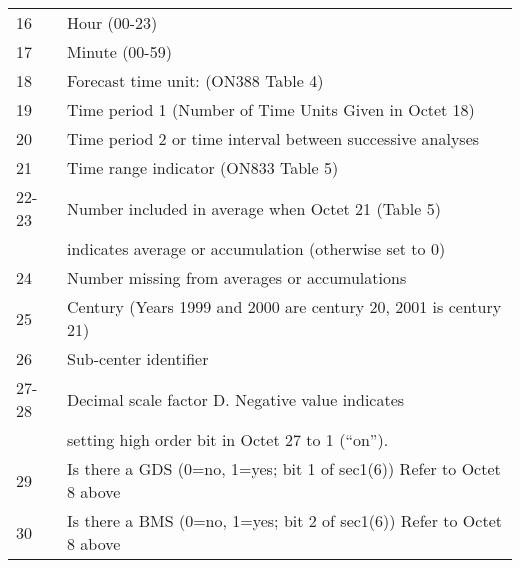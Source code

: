 \begin{table}[H]
\begin{tabular}{l|l}
   16 &  Hour (00-23)           \\                                         
   17 &  Minute (00-59)           \\                                      
   18 &  Forecast time unit: (ON388 Table 4) \\                            
   19 &  Time period 1 (Number of Time Units  Given in Octet 18) \\                                              
   20 &  Time period 2 or time interval between successive analyses\\                                                 
   21 &  Time range indicator (ON833 Table 5)   \\                         
22-23 & Number included in average when Octet 21 (Table 5) \\
      & indicates average or accumulation (otherwise set to 0) \\                                 
   24 &  Number missing from averages or accumulations    \\                       
   25 &  Century (Years 1999 and 2000 are century 20, 2001 is century 21)\\
   26 &  Sub-center identifier             \\                            
27-28 &  Decimal scale factor D.  Negative value indicates \\ 
      & setting high order bit in Octet 27 to 1 (``on''). \\                                  
   29 &  Is there a GDS (0=no, 1=yes; bit 1 of sec1(6))  Refer to Octet 8 above       \\
   30 &  Is there a BMS (0=no, 1=yes; bit 2 of sec1(6))  Refer to Octet 8 above \\

\hline
\hline
\end{tabular}
\label{table:sec1}
\end{table}

